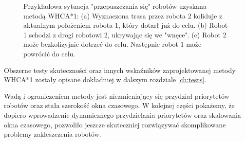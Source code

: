 \begin{figure}
	\centering
		\qquad
		\qquad
	\caption{Przykładowa sytuacja "przepuszczania się" robotów uzyskana metodą WHCA*1:
	(a) Wyznaczona trasa przez robota 2 koliduje z aktualnym położeniem robota 1, który dotarł już do celu.
	(b) Robot 1 schodzi z drogi robotowi 2, ukrywając się we "wnęce".
	(c) Robot 2 może bezkolizyjnie dotrzeć do celu. Następnie robot 1 może powrócić do celu.}
	\label{fig:whca-giveway}
\end{figure}

Obszerne testy skuteczności oraz innych wskaźników zaprojektowanej metody WHCA*1 zostały opisane dokładniej w dalszym rozdziale \ref{ch:tests}.

Wadą i ograniczeniem metody jest niezmieniający się przydział priorytetów robotów oraz stała szerokość okna czasowego.
W kolejnej części pokażemy, że dopiero wprowadzenie dynamicznego przydzielania priorytetów oraz skalowania okna czasowego, pozwoliło jeszcze skuteczniej rozwiązywać skomplikowane problemy zakleszczenia robotów.
